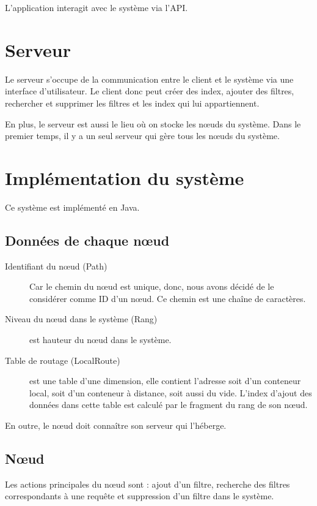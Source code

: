 \documentclass[a4paper,11pt]{report}
\begin{document}
	L'application interagit avec le système via l'API.
	
\section{Serveur}
	Le serveur s'occupe de la communication entre le client et le système via une interface d'utilisateur. Le client donc peut créer des index, ajouter des filtres, rechercher et supprimer les filtres et les index qui lui appartiennent.
	
	En plus, le serveur est aussi le lieu où on stocke les nœuds du système. Dans le premier temps, il y a un seul serveur qui gère tous les nœuds du système.
	
\section{Implémentation du système}
	Ce système est implémenté en Java.

\subsection{Données de chaque nœud}
	\begin{description}
		\item[Identifiant du nœud (Path)] Car le chemin du nœud est unique, donc, nous avons décidé de le considérer comme ID d'un nœud. Ce chemin est une chaîne de caractères.
		\item[Niveau du nœud dans le système (Rang)] est hauteur du nœud dans le système.
		\item[Table de routage (LocalRoute)] est une table d'une dimension, elle contient l'adresse soit d'un conteneur local, soit d'un conteneur à distance, soit aussi du vide. L'index d'ajout des données dans cette table est calculé par le fragment du rang de son nœud.
	\end{description}
	
	En outre, le nœud doit connaître son serveur qui l'héberge.
	
\subsection{Nœud}
	Les actions principales du nœud sont : ajout d'un filtre, recherche des filtres correspondants à une requête et suppression d'un filtre dans le système.
\end{document}
